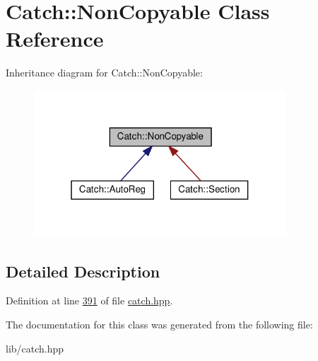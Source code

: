 \hypertarget{classCatch_1_1NonCopyable}{}\section{Catch\+::Non\+Copyable Class Reference}
\label{classCatch_1_1NonCopyable}


Inheritance diagram for Catch\+::Non\+Copyable\+:\nopagebreak
\begin{figure}[H]
\begin{center}
\leavevmode
\includegraphics[width=268pt]{classCatch_1_1NonCopyable__inherit__graph}
\end{center}
\end{figure}


\subsection{Detailed Description}


Definition at line \mbox{\hyperlink{catch_8hpp_source_l00391}{391}} of file \mbox{\hyperlink{catch_8hpp_source}{catch.\+hpp}}.



The documentation for this class was generated from the following file\+:\begin{DoxyCompactItemize}
\item 
lib/catch.\+hpp\end{DoxyCompactItemize}

